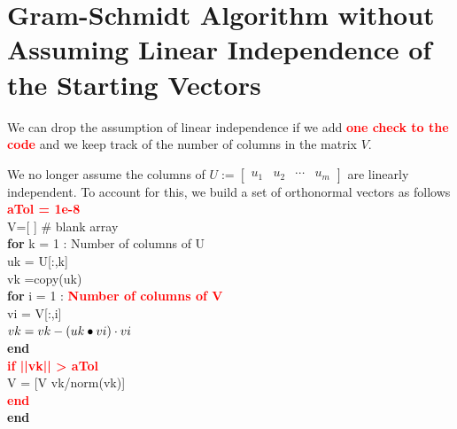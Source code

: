 \section{Gram-Schmidt Algorithm without Assuming Linear Independence of the Starting Vectors}

We can drop the assumption of linear independence if we add \textcolor{red}{\bf one check to the code} and we keep track of the number of columns in the matrix $V$.\\


\begin{tcolorbox}[ title=\textbf{\Large \textcolor{red}{Gram-Schmidt w/o Assuming Linear Independence}}]

We no longer assume the columns of $U:=\left[ \begin{array}{cccc} u_1 & u_2 & \cdots  & u_m \end{array} \right] $
are linearly independent. To account for this, we build a set of orthonormal vectors as follows\\

{\rm 
\textcolor{red}{\bf aTol = 1e-8} \\
V=[ ] \# blank array\\
\textbf{for} k = 1 : Number of columns of U\\
\hspace*{1cm} uk = U[:,k]\\
\hspace*{1cm} vk =copy(uk)\\
\hspace*{1cm} \textbf{for} i = 1 : \textcolor{red}{\bf Number of columns of V}\\
\hspace*{2cm} vi = V[:,i]\\
\hspace*{2cm} $\mathlarger{vk = vk - (uk \bullet vi)  \cdot vi}$\\
\hspace*{1cm} \textbf{end}\\
\hspace*{1cm} \textcolor{red}{\bf if ||vk|| > aTol}\\
\hspace*{2cm} V = [V vk/norm(vk)] \\
\hspace*{1cm} \textcolor{red}{\bf end} \\
\textbf{end}
}
\end{tcolorbox}

